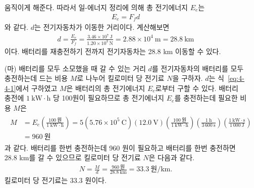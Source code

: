 \documentclass[tightenlines,floatfix,nofootinbib,superscriptaddress,fleqn]{revtex4-2}
\begin{document}
\begin{itemize}
  움직이게 해준다. 따라서 일-에너지 정리에 의해 총 전기에너지 $E_e$는
  \begin{align}
    E_e = F_f d
  \end{align}
  와 같다. $d$는 전기자동차가 이동한 거리이다. 계산해보면
  \begin{align}\label{eq:4-4-1}
    d = \frac{E_e}{F_f} = \frac{3.46\times 10^7~\mathrm{J}}
    {1.20\times 10^3~\mathrm{N}} = 2.88\times 10^4~\mathrm{m}
    =28.8~\mathrm{km}
  \end{align}
  이다. 배터리를 재충전하기 전까지 전기자동차는 28.8 km 이동할 수 있다.
  \item[(마)] 
  배터리를 모두 소모했을 때 갈 수 있는 거리 $d$를
  전기자동차의 배터리를 모두 충전하는데 드는 비용 $M$로 나누어
  킬로미터 당 전기료 $N$을 구하자. $d$는 식~\eqref{eq:4-4-1}에서 구하였고 
  $M$은 배터리의 총 전기에너지 $E_e$로부터 구할 수 있다. 배터리 충전에
  $1~\mathrm{kW\cdot h}$ 당 100원이 필요하므로 총 전기에너지 $E_e$를 충전하는데
  필요한 비용 $M$은
  \begin{align}
    \begin{split}
      M &= E_e\left(\frac{100~\text{원}}{1~\mathrm{kW\cdot h}}\right)
      = 5(5.76\times 10^{5}~\mathrm{C})(12.0~\mathrm{V})
      \left(\frac{100~\text{원}}{1~\mathrm{kW\cdot h}}\right)
      \left(\frac{1~\mathrm{h}}{3\,600~\mathrm{s}}\right)
      \left(\frac{1~\mathrm{kW\cdot s}}{1\,000~\mathrm{J}}\right) \\
      &=960~\text{원}
    \end{split}
  \end{align}
  과 같다. 배터리를 한번 충전하는데 960 원이 필요하고 배터리를 한번 충전하면 
  28.8 km를 갈 수 있으므로 킬로미터 당 전기료 $N$은 다음과 같다.
  \begin{align}
    N = \frac{M}{d} = \frac{960~\text{원}}{28.8~\mathrm{km}}
    =33.3~\text{원/km}.
  \end{align}
  킬로미터 당 전기료는 33.3 원이다.
\end{itemize}
\end{document}
